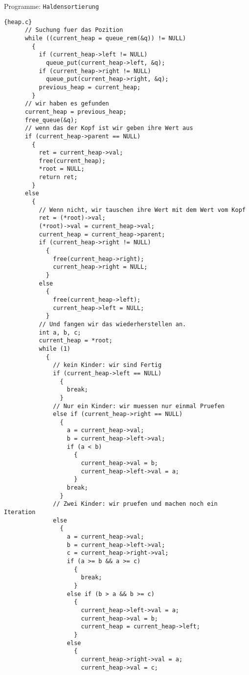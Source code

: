 \begin{myexampleprogram}{Programme: \texttt{Haldensortierung}}
\begin{lstlisting}{heap.c}
      // Suchung fuer das Pozition
      while ((current_heap = queue_rem(&q)) != NULL)
        {
          if (current_heap->left != NULL)
            queue_put(current_heap->left, &q);
          if (current_heap->right != NULL)
            queue_put(current_heap->right, &q);
          previous_heap = current_heap;
        }
      // wir haben es gefunden
      current_heap = previous_heap;
      free_queue(&q);
      // wenn das der Kopf ist wir geben ihre Wert aus
      if (current_heap->parent == NULL)
        {
          ret = current_heap->val;
          free(current_heap);
          *root = NULL;
          return ret;
        }
      else
        {
          // Wenn nicht, wir tauschen ihre Wert mit dem Wert vom Kopf
          ret = (*root)->val;
          (*root)->val = current_heap->val;
          current_heap = current_heap->parent;
          if (current_heap->right != NULL)
            {
              free(current_heap->right);
              current_heap->right = NULL;
            }
          else
            {
              free(current_heap->left);
              current_heap->left = NULL;
            }
          // Und fangen wir das wiederherstellen an.
          int a, b, c;
          current_heap = *root;
          while (1)
            {
              // kein Kinder: wir sind Fertig
              if (current_heap->left == NULL)
                {
                  break;
                }
              // Nur ein Kinder: wir muessen nur einmal Pruefen
              else if (current_heap->right == NULL)
                {
                  a = current_heap->val;
                  b = current_heap->left->val;
                  if (a < b)
                    {
                      current_heap->val = b;
                      current_heap->left->val = a;
                    }
                  break;
                }
              // Zwei Kinder: wir pruefen und machen noch ein Iteration
              else
                {
                  a = current_heap->val;
                  b = current_heap->left->val;
                  c = current_heap->right->val;
                  if (a >= b && a >= c)
                    {
                      break;
                    }
                  else if (b > a && b >= c)
                    {
                      current_heap->left->val = a;
                      current_heap->val = b;
                      current_heap = current_heap->left;
                    }
                  else
                    {
                      current_heap->right->val = a;
                      current_heap->val = c;

\end{lstlisting}
\end{myexampleprogram}

